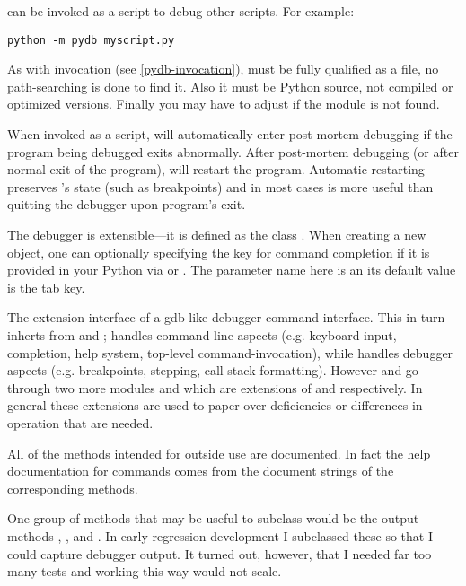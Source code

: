  can be invoked as a script to debug other scripts.  For
example:

\begin{verbatim}
python -m pydb myscript.py
\end{verbatim}

As with  invocation (see \ref{pydb-invocation}), 
must be fully qualified as a file, no path-searching is done to find
it. Also it must be Python source, not compiled or optimized
versions. Finally you may have to adjust  if the
module  is not found.

When invoked as a script,  will automatically enter
post-mortem debugging if the program being debugged exits
abnormally. After post-mortem debugging (or after normal exit of the
program),  will restart the program. Automatic restarting
preserves 's state (such as breakpoints) and in most cases
is more useful than quitting the debugger upon program's exit.

The debugger is extensible---it is defined as the class
.  When
creating a new  object, one can optionally specifying the
key for command completion if it is provided in your Python via
or . The parameter name here is
 an its default value is the tab key.

The  extension interface of  a gdb-like debugger
command interface. This in turn inherts from  and
;  handles command-line aspects (e.g. keyboard
input, completion, help system, top-level command-invocation), while
 handles debugger aspects (e.g. breakpoints, stepping, call
stack formatting). However  and  go through two
more modules  and  which are extensions of
 and 
respectively. In general these extensions are used to paper over
deficiencies or differences in operation that are needed.

All of the methods intended for outside use are documented. In fact
the help documentation for commands comes from the document strings of
the corresponding methods.

One group of methods that may be useful to subclass would be the
output methods , , and
. In early regression development I subclassed these
so that I could capture debugger output. It turned out, however, that
I needed far too many tests and working this way would not scale.

